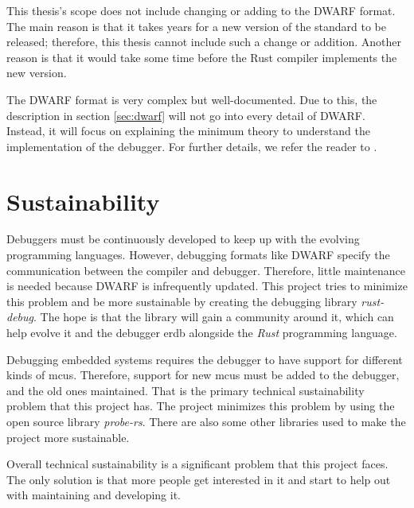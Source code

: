 This thesis's scope does not include changing or adding to the \gls{DWARF} format.
The main reason is that it takes years for a new version of the standard to be released; therefore, this thesis cannot include such a change or addition.
Another reason is that it would take some time before the Rust compiler implements the new version.


The \gls{DWARF} format is very complex but well-documented.
Due to this, the description in section \ref{sec:dwarf} will not go into every detail of \gls{DWARF}.
Instead, it will focus on explaining the minimum theory to understand the implementation of the debugger.
For further details, we refer the reader to \cite{dwarf}.

\section{Sustainability}
Debuggers must be continuously developed to keep up with the evolving programming languages.
However, debugging formats like \gls{DWARF} specify the communication between the compiler and debugger.
Therefore, little maintenance is needed because \gls{DWARF} is infrequently updated.
This project tries to minimize this problem and be more sustainable by creating the debugging library \emph{rust-debug}.
The hope is that the library will gain a community around it, which can help evolve it and the debugger \gls{erdb} alongside the \emph{Rust} programming language.


Debugging embedded systems requires the debugger to have support for different kinds of \glspl{mcu}.
Therefore, support for new \glspl{mcu} must be added to the debugger, and the old ones maintained.
That is the primary technical sustainability problem that this project has.
The project minimizes this problem by using the open source library \emph{probe-rs}.
There are also some other libraries used to make the project more sustainable.


Overall technical sustainability is a significant problem that this project faces.
The only solution is that more people get interested in it and start to help out with maintaining and developing it.

